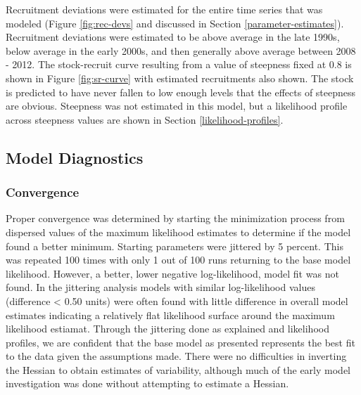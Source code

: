 \documentclass[11pt,
  english,
  a4paper,
]{article}
\begin{document}
Recruitment deviations were estimated for the entire time series that was modeled (Figure \ref{fig:rec-devs} and discussed in Section \ref{parameter-estimates}). Recruitment deviations were estimated to be above average in the late 1990s, below average in the early 2000s, and then generally above average between 2008 - 2012. The stock-recruit curve resulting from a value of steepness fixed at 0.8 is shown in Figure \ref{fig:sr-curve} with estimated recruitments also shown. The stock is predicted to have never fallen to low enough levels that the effects of steepness are obvious. Steepness was not estimated in this model, but a likelihood profile across steepness values are shown in Section \ref{likelihood-profiles}.

\leavevmode\tagmcend\tagstructend\par


\hypertarget{model-diagnostics}{%
\subsection{Model Diagnostics}\label{model-diagnostics}}

\leavevmode\tagmcend\tagstructend


\hypertarget{convergence}{%
\subsubsection{Convergence}\label{convergence}}

\leavevmode\tagmcend\tagstructend


Proper convergence was determined by starting the minimization process from dispersed values of the maximum likelihood estimates to determine if the model found a better minimum. Starting parameters were jittered by 5 percent. This was repeated 100 times with only 1 out of 100 runs returning to the base model likelihood. However, a better, lower negative log-likelihood, model fit was not found. In the jittering analysis models with similar log-likelihood values (difference \textless{} 0.50 units) were often found with little difference in overall model estimates indicating a relatively flat likelihood surface around the maximum likelihood estiamat. Through the jittering done as explained and likelihood profiles, we are confident that the base model as presented represents the best fit to the data given the assumptions made. There were no difficulties in inverting the Hessian to obtain estimates of variability, although much of the early model investigation was done without attempting to estimate a Hessian.
\end{document}
